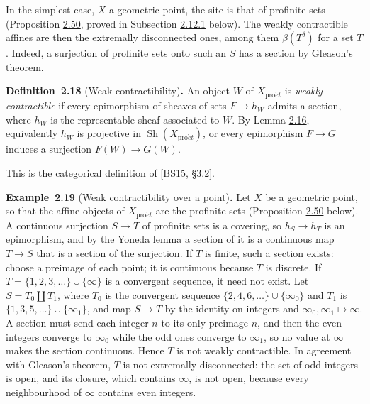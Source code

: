\documentclass[11pt]{article}
\newenvironment{bpstatement}[2]{\par\addvspace{0.6\baselineskip}\noindent\textbf{#1}#2\textbf{.}\enspace\ignorespaces}
  {\par\addvspace{0.4\baselineskip}}
\providecommand{\Sh}{}\renewcommand{\Sh}{\operatorname{Sh}}
\begin{document}
In the simplest case, \(X\) a geometric point, the site is that of profinite sets (Proposition \hyperref[bp153]{2.50}, proved in Subsection \hyperref[bp151]{2.12.1} below). The weakly contractible affines are then the extremally disconnected ones, among them \(\beta(T^\delta)\) for a set \(T\). Indeed, a surjection of profinite sets onto such an \(S\) has a section by Gleason's theorem.

\label{bp55}%
\begin{bpstatement}{Definition~2.18}{ (Weak contractibility)}
An object \(W\) of \(X_{\mathrm{pro}\acute{e}t}\) is \emph{weakly contractible} if every epimorphism of sheaves of sets \(F\to h_W\) admits a section, where \(h_W\) is the representable sheaf associated to \(W\). By Lemma \hyperref[bp49]{2.16}, equivalently \(h_W\) is projective in \(\Sh(X_{\mathrm{pro}\acute{e}t})\), or every epimorphism \(F\to G\) induces a surjection \(F(W)\to G(W)\).
\end{bpstatement}

\label{bp56}%
This is the categorical definition of [\hyperref[bp705]{BS15}, §3.2].

\label{bp57}%
\begin{bpstatement}{Example~2.19}{ (Weak contractibility over a point)}
Let \(X\) be a geometric point, so that the affine objects of \(X_{\mathrm{pro}\acute{e}t}\) are the profinite sets (Proposition \hyperref[bp153]{2.50} below). A continuous surjection \(S\to T\) of profinite sets is a covering, so \(h_S\to h_T\) is an epimorphism, and by the Yoneda lemma a section of it is a continuous map \(T\to S\) that is a section of the surjection. If \(T\) is finite, such a section exists: choose a preimage of each point; it is continuous because \(T\) is discrete. If \(T=\{1,2,3,\ldots\}\cup\{\infty\}\) is a convergent sequence, it need not exist. Let \(S=T_0\amalg T_1\), where \(T_0\) is the convergent sequence \(\{2,4,6,\ldots\}\cup\{\infty_0\}\) and \(T_1\) is \(\{1,3,5,\ldots\}\cup\{\infty_1\}\), and map \(S\to T\) by the identity on integers and \(\infty_0,\infty_1\mapsto\infty\). A section must send each integer \(n\) to its only preimage \(n\), and then the even integers converge to \(\infty_0\) while the odd ones converge to \(\infty_1\), so no value at \(\infty\) makes the section continuous. Hence \(T\) is not weakly contractible. In agreement with Gleason's theorem, \(T\) is not extremally disconnected: the set of odd integers is open, and its closure, which contains \(\infty\), is not open, because every neighbourhood of \(\infty\) contains even integers.
\end{bpstatement}
\end{document}
